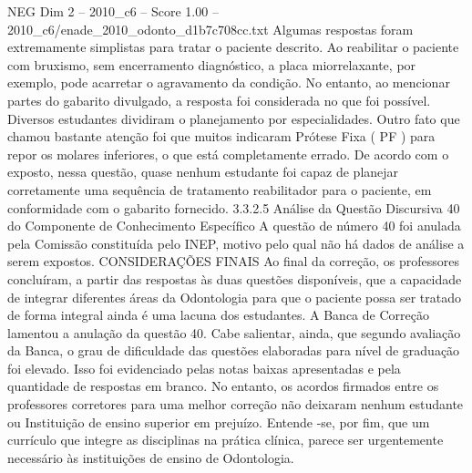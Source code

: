 \begin{textsample}{NEG Dim 2 – 2010\_c6 – Score 1.00 – 2010\_c6/enade\_2010\_odonto\_d1b7c708cc.txt}
Algumas respostas foram extremamente simplistas para tratar o paciente descrito.
Ao reabilitar o paciente com bruxismo, sem encerramento diagnóstico, a placa miorrelaxante, por exemplo, pode acarretar o agravamento da condição.
No entanto, ao mencionar partes do gabarito divulgado, a resposta foi considerada no que foi possível.
Diversos estudantes dividiram o planejamento por especialidades.
Outro fato que chamou bastante atenção foi que muitos indicaram Prótese Fixa ( PF ) para repor os molares inferiores, o que está completamente errado.
De acordo com o exposto, nessa questão, quase nenhum estudante foi capaz de planejar corretamente uma sequência de tratamento reabilitador para o paciente, em conformidade com o gabarito fornecido. 3.3.2.5 Análise da Questão Discursiva 40 do Componente de Conhecimento Específico A questão de número 40 foi anulada pela Comissão constituída pelo INEP, motivo pelo qual não há dados de análise a serem expostos.
CONSIDERAÇÕES FINAIS Ao final da correção, os professores concluíram, a partir das respostas às duas questões disponíveis, que a capacidade de integrar diferentes áreas da Odontologia para que o paciente possa ser tratado de forma integral ainda é uma lacuna dos estudantes.
A Banca de Correção lamentou a anulação da questão 40.
Cabe salientar, ainda, que segundo avaliação da Banca, o grau de dificuldade das questões elaboradas para nível de graduação foi elevado.
Isso foi evidenciado pelas notas baixas apresentadas e pela quantidade de respostas em branco.
No entanto, os acordos firmados entre os professores corretores para uma melhor correção não deixaram nenhum estudante ou Instituição de ensino superior em prejuízo.
Entende -se, por fim, que um currículo que integre as disciplinas na prática clínica, parece ser urgentemente necessário às instituições de ensino de Odontologia.

\end{textsample}
